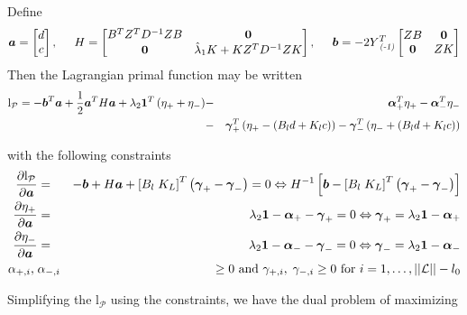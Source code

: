 \documentclass[12pt]{article}
\newcommand{\bfgamma}{\mbox{\boldmath $\gamma$}}
\newcommand{\bfalpha}{\mbox{\boldmath $\alpha$}}
\newcommand{\bfone}{\mbox{\boldmath $1$}}
\newcommand{\bfo}{\mbox{\boldmath $0$}}
\newcommand{\bfa}{\mbox{\boldmath $a$}}
\newcommand{\bfb}{\mbox{\boldmath $b$}}
\theoremstyle{definition}
\begin{document}
Define
\[
\bfa = \begin{bmatrix} d\\ c \end{bmatrix},\;\;\;\;\;  H = \begin{bmatrix} B^TZ^TD^{-1}Z B & \bfo \\ \bfo & \hat{\lambda}_1K + KZ^TD^{-1}Z K   \end{bmatrix},\;\;\;\;\;\bfb = -2Y_{\textsc{ {\textsl{(-1)}}}}^T\begin{bmatrix}ZB & \bfo \\ \bfo & ZK \end{bmatrix}
\]
\noindent
Then the Lagrangian primal function may be written
\begin{eqnarray}
\mathrm{l}_{\mathcal{P}} = -\bfb^T\bfa + \frac{1}{2}\bfa^T  H \bfa + \lambda_2 \bfone^T\left( \eta_{+}+ \eta_{-}\right) &-& \bfalpha_+^T\eta_+ - \bfalpha_-^T\eta_{-} \label{lagrange_primal} \\ \nonumber
 &-& \bfgamma_+^T\left(\eta_+ - \left(B_ld + K_lc \right)  \right) - \bfgamma_-^T\left(\eta_- + \left(B_ld + K_lc \right)  \right) 
\end{eqnarray}

with the following constraints
\begin{eqnarray*}
\frac{\partial \mathrm{l}_{\mathcal{P}}}{\partial \bfa} &=& -\bfb +  H\bfa + \left[ B_l\;K_L \right]^T \left(\bfgamma_+ - \bfgamma_- \right) = 0 \Leftrightarrow  H^{-1}\left[ \bfb - \left[ B_l\;K_L \right]^T \left(\bfgamma_+ - \bfgamma_-\right) \right]  \\
\frac{\partial \eta_+}{\partial \bfa} &=& \lambda_2\bfone - \bfalpha_+ - \bfgamma_+ = 0 \Leftrightarrow \bfgamma_+ = \lambda_2\bfone - \bfalpha_+\\
\frac{\partial \eta_-}{\partial \bfa} &=& \lambda_2\bfone - \bfalpha_- - \bfgamma_- = 0 \Leftrightarrow \bfgamma_- = \lambda_2 \bfone - \bfalpha_-\\
\alpha_{+,i},\;&\alpha_{-,i}& \ge 0 \mbox{ and } \gamma_{+,i},\;\gamma_{-,i} \ge0 \mbox{ for }i=1,\dots,\vert \vert \mathcal{L}\vert \vert-l_0
\end{eqnarray*}

Simplifying the $\mathrm{l}_\mathcal{P}$ using the constraints, we have the dual problem of maximizing
\end{document}
